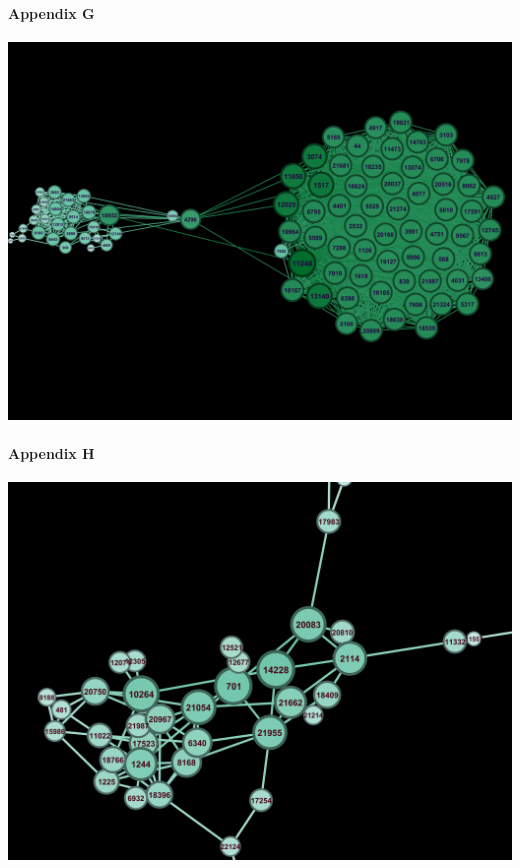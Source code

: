 \documentclass[11pt,twocolumn]{article}
\begin{document}
\paragraph{Appendix G\newline\newline\newline\newline\newline}
\includegraphics[scale=0.22]{closennesscentraility_tv.png}
\paragraph{{\newline}Appendix H\newline\newline\newline\newline\newline}
\includegraphics[scale=0.22]{closennesscentraility_com.png}
\end{document}

